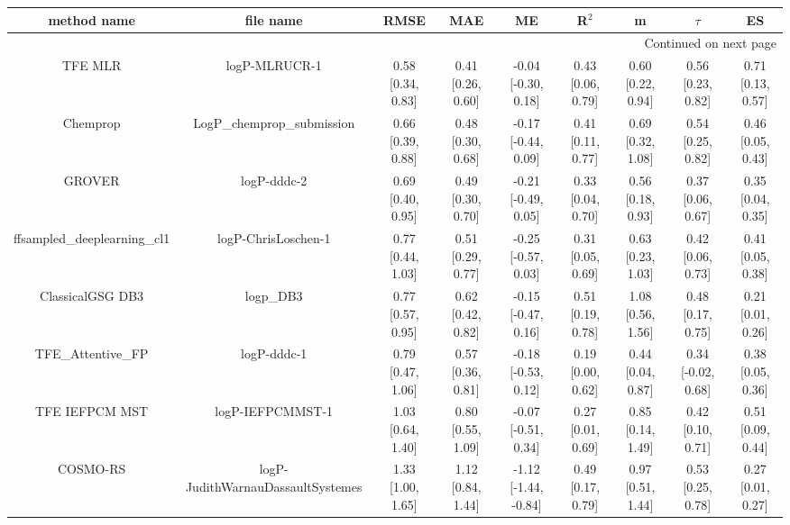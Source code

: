 \documentclass{article}
\begin{document}
\begin{center}
\scriptsize
\begin{longtable}{|ccccccccc|}
\toprule
                method name &                                   file name &               RMSE &                MAE &                    ME &              R$^2$ &                     m &                $\tau$ &                    ES \\
\midrule
\endhead
\midrule
\multicolumn{9}{r}{{Continued on next page}} \\
\midrule
\endfoot

\bottomrule
\endlastfoot
                    TFE MLR &                               logP-MLRUCR-1 &  0.58 [0.34, 0.83] &  0.41 [0.26, 0.60] &   -0.04 [-0.30, 0.18] &  0.43 [0.06, 0.79] &     0.60 [0.22, 0.94] &     0.56 [0.23, 0.82] &     0.71 [0.13, 0.57] \\
                   Chemprop &                  LogP\_chemprop\_submission &  0.66 [0.39, 0.88] &  0.48 [0.30, 0.68] &   -0.17 [-0.44, 0.09] &  0.41 [0.11, 0.77] &     0.69 [0.32, 1.08] &     0.54 [0.25, 0.82] &     0.46 [0.05, 0.43] \\
                     GROVER &                                 logP-dddc-2 &  0.69 [0.40, 0.95] &  0.49 [0.30, 0.70] &   -0.21 [-0.49, 0.05] &  0.33 [0.04, 0.70] &     0.56 [0.18, 0.93] &     0.37 [0.06, 0.67] &     0.35 [0.04, 0.35] \\
 ffsampled_deeplearning_cl1 &                         logP-ChrisLoschen-1 &  0.77 [0.44, 1.03] &  0.51 [0.29, 0.77] &   -0.25 [-0.57, 0.03] &  0.31 [0.05, 0.69] &     0.63 [0.23, 1.03] &     0.42 [0.06, 0.73] &     0.41 [0.05, 0.38] \\
           ClassicalGSG DB3 &                                   logp\_DB3 &  0.77 [0.57, 0.95] &  0.62 [0.42, 0.82] &   -0.15 [-0.47, 0.16] &  0.51 [0.19, 0.78] &     1.08 [0.56, 1.56] &     0.48 [0.17, 0.75] &     0.21 [0.01, 0.26] \\
           TFE_Attentive_FP &                                 logP-dddc-1 &  0.79 [0.47, 1.06] &  0.57 [0.36, 0.81] &   -0.18 [-0.53, 0.12] &  0.19 [0.00, 0.62] &     0.44 [0.04, 0.87] &    0.34 [-0.02, 0.68] &     0.38 [0.05, 0.36] \\
             TFE IEFPCM MST &                            logP-IEFPCMMST-1 &  1.03 [0.64, 1.40] &  0.80 [0.55, 1.09] &   -0.07 [-0.51, 0.34] &  0.27 [0.01, 0.69] &     0.85 [0.14, 1.49] &     0.42 [0.10, 0.71] &     0.51 [0.09, 0.44] \\
                   COSMO-RS &           logP-JudithWarnauDassaultSystemes &  1.33 [1.00, 1.65] &  1.12 [0.84, 1.44] &  -1.12 [-1.44, -0.84] &  0.49 [0.17, 0.79] &     0.97 [0.51, 1.44] &     0.53 [0.25, 0.78] &     0.27 [0.01, 0.27] \\

\end{longtable}
\end{center}
\end{document}
